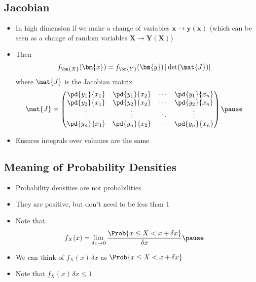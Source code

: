 \begin{slide}
\section[-1]{Jacobian}

\begin{PauseHighLight}
  \begin{itemize}
  \item In high dimension if we make a change of variables
    $\bm{x} \rightarrow \bm{y}(\bm{x})$ (which can be seen as a change
    of random variables $\bm{X}\rightarrow\bm{Y}(\bm{X})$)\pause
  \item Then
    \begin{align*}
      f_{\bm{X}}(\bm{x}) = f_{\bm{Y}}(\bm{y}) \, |\det(\mat{J})| 
    \end{align*}
    where $\mat{J}$ is the Jacobian matrix
    \begin{align*}
      \mat{J} =
      \begin{pmatrix}
        \pd{y_1}{x_1} & \pd{y_1}{x_2} & \cdots & \pd{y_1}{x_n} \\
        \pd{y_2}{x_1} & \pd{y_2}{x_2} & \cdots & \pd{y_2}{x_n} \\
        \vdots & \vdots & \ddots & \vdots \\
        \pd{y_n}{x_1} & \pd{y_n}{x_2} & \cdots & \pd{y_n}{x_n}
      \end{pmatrix}\pause
    \end{align*}
  \item Ensures integrals over volumes are the same\pause
  \end{itemize}
\end{PauseHighLight}

\end{slide}


\begin{slide}
\section{Meaning of Probability Densities}

\begin{PauseHighLight}
  \begin{itemize}
  \item Probability densities are not probabilities\pause
  \item They are positive, but don't need to be less than 1\pause
  \item Note that
    \begin{align*}
      f_X(x) = \lim_{\delta x\rightarrow 0}
      \frac{\Prob{x \leq X < x + \delta x}}{\delta x}\pause
    \end{align*}
  \item We can think of $f_X(x)\,\delta x$ as $\Prob{x \leq X < x +
      \delta x}$\pause
  \item Note that $f_X(x)\,\delta x\leq 1$\pause
  \end{itemize}
\end{PauseHighLight}

\end{slide}



